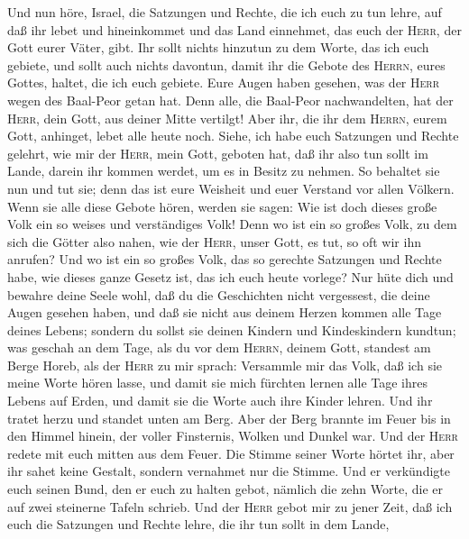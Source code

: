  Und nun höre, Israel, die Satzungen und Rechte, die ich
euch zu tun lehre, auf daß ihr lebet und hineinkommet und das Land
einnehmet, das euch der \textsc{Herr}, der Gott eurer Väter, gibt.
 Ihr sollt nichts hinzutun zu dem Worte, das ich euch
gebiete, und sollt auch nichts davontun, damit ihr die Gebote des
\textsc{Herrn}, eures Gottes, haltet, die ich euch gebiete.
 Eure Augen haben gesehen, was der \textsc{Herr} wegen des
Baal-Peor getan hat. Denn alle, die Baal-Peor nachwandelten, hat der
\textsc{Herr}, dein Gott, aus deiner Mitte vertilgt!  Aber
ihr, die ihr dem \textsc{Herrn}, eurem Gott, anhinget, lebet alle heute
noch.  Siehe, ich habe euch Satzungen und Rechte gelehrt,
wie mir der \textsc{Herr}, mein Gott, geboten hat, daß ihr also tun
sollt im Lande, darein ihr kommen werdet, um es in Besitz zu nehmen.
 So behaltet sie nun und tut sie; denn das ist eure
Weisheit und euer Verstand vor allen Völkern. Wenn sie alle diese Gebote
hören, werden sie sagen: Wie ist doch dieses große Volk ein so weises
und verständiges Volk!  Denn wo ist ein so großes Volk, zu
dem sich die Götter also nahen, wie der \textsc{Herr}, unser Gott, es
tut, so oft wir ihn anrufen?  Und wo ist ein so großes
Volk, das so gerechte Satzungen und Rechte habe, wie dieses ganze Gesetz
ist, das ich euch heute vorlege?  Nur hüte dich und
bewahre deine Seele wohl, daß du die Geschichten nicht vergessest, die
deine Augen gesehen haben, und daß sie nicht aus deinem Herzen kommen
alle Tage deines Lebens; sondern du sollst sie deinen Kindern und
Kindeskindern kundtun;  was geschah an dem Tage, als du
vor dem \textsc{Herrn}, deinem Gott, standest am Berge Horeb, als der
\textsc{Herr} zu mir sprach: Versammle mir das Volk, daß ich sie meine
Worte hören lasse, und damit sie mich fürchten lernen alle Tage ihres
Lebens auf Erden, und damit sie die Worte auch ihre Kinder lehren.
 Und ihr tratet herzu und standet unten am Berg. Aber der
Berg brannte im Feuer bis in den Himmel hinein, der voller Finsternis,
Wolken und Dunkel war.  Und der \textsc{Herr} redete mit
euch mitten aus dem Feuer. Die Stimme seiner Worte hörtet ihr, aber ihr
sahet keine Gestalt, sondern vernahmet nur die Stimme. 
Und er verkündigte euch seinen Bund, den er euch zu halten gebot,
nämlich die zehn Worte, die er auf zwei steinerne Tafeln schrieb.
 Und der \textsc{Herr} gebot mir zu jener Zeit, daß ich
euch die Satzungen und Rechte lehre, die ihr tun sollt in dem Lande,
